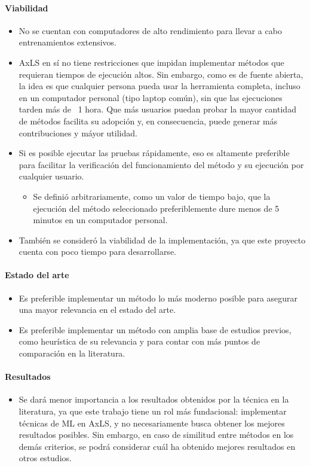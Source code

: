 \paragraph{Viabilidad}
\begin{itemize}
  \item No se cuentan con computadores de alto rendimiento para llevar a cabo
    entrenamientos extensivos.
  \item AxLS en sí no tiene restricciones que impidan implementar métodos que
    requieran tiempos de ejecución altos. Sin embargo, como es de fuente
    abierta, la idea es que cualquier persona pueda usar la herramienta
    completa, incluso en un computador personal (tipo laptop común), sin que
    las ejecuciones tarden más de ~1 hora. Que más usuarios puedan probar la
    mayor cantidad de métodos facilita su adopción y, en consecuencia, puede
    generar más contribuciones y máyor utilidad.
  \item Si es posible ejecutar las pruebas rápidamente, eso es altamente
    preferible para facilitar la verificación del funcionamiento del método
    y su ejecución por cualquier usuario.
    \begin{itemize}
      \item Se definió arbitrariamente, como un valor de tiempo bajo, que la
        ejecución del método seleccionado preferiblemente dure menos de 5
        minutos en un computador personal.
    \end{itemize}

  \item También se consideró la viabilidad de la implementación, ya que este
    proyecto cuenta con poco tiempo para desarrollarse.
\end{itemize}

\paragraph{Estado del arte}
\begin{itemize}
  \item Es preferible implementar un método lo más moderno posible para
    asegurar una mayor relevancia en el estado del arte.

  \item Es preferible implementar un método con amplia base de estudios
    previos, como heurística de su relevancia y para contar con más puntos de
    comparación en la literatura.
\end{itemize}

\paragraph{Resultados}
\begin{itemize}
  \item Se dará menor importancia a los resultados obtenidos por la técnica
    en la literatura, ya que este trabajo tiene un rol más fundacional:
    implementar técnicas de ML en AxLS, y no necesariamente busca obtener los
    mejores resultados posibles. Sin embargo, en caso de similitud entre
    métodos en los demás criterios, se podrá considerar cuál ha obtenido
    mejores resultados en otros estudios.
\end{itemize}

